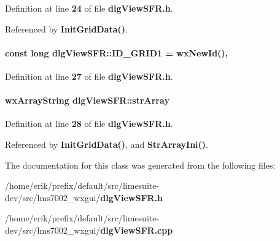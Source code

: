 Definition at line {\bf 24} of file {\bf dlg\+View\+S\+F\+R.\+h}.



Referenced by {\bf Init\+Grid\+Data()}.

\paragraph[{I\+D\+\_\+\+G\+R\+I\+D1}]{\setlength{\rightskip}{0pt plus 5cm}const long dlg\+View\+S\+F\+R\+::\+I\+D\+\_\+\+G\+R\+I\+D1 = wx\+New\+Id()\hspace{0.3cm}{\ttfamily [static]}, {\ttfamily [protected]}}\label{classdlgViewSFR_a34699eaf524725b3c3ea9ad776cdc8f7}


Definition at line {\bf 27} of file {\bf dlg\+View\+S\+F\+R.\+h}.

\paragraph[{str\+Array}]{\setlength{\rightskip}{0pt plus 5cm}wx\+Array\+String dlg\+View\+S\+F\+R\+::str\+Array\hspace{0.3cm}{\ttfamily [protected]}}\label{classdlgViewSFR_ab8682ade7aa5709369cd9e34d34a0167}


Definition at line {\bf 28} of file {\bf dlg\+View\+S\+F\+R.\+h}.



Referenced by {\bf Init\+Grid\+Data()}, and {\bf Str\+Array\+Ini()}.



The documentation for this class was generated from the following files\+:\begin{DoxyCompactItemize}
\item 
/home/erik/prefix/default/src/limesuite-\/dev/src/lms7002\+\_\+wxgui/{\bf dlg\+View\+S\+F\+R.\+h}\item 
/home/erik/prefix/default/src/limesuite-\/dev/src/lms7002\+\_\+wxgui/{\bf dlg\+View\+S\+F\+R.\+cpp}\end{DoxyCompactItemize}
